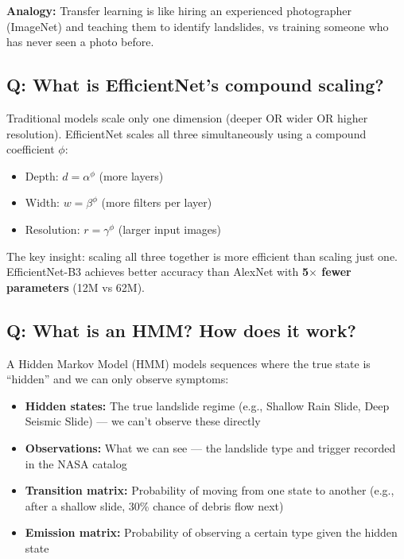 \documentclass[11pt]{article}
\begin{document}
\textbf{Analogy:} Transfer learning is like hiring an experienced photographer (ImageNet) and teaching them to identify landslides, vs training someone who has never seen a photo before.

\subsection{Q: What is EfficientNet's compound scaling?}

Traditional models scale only one dimension (deeper OR wider OR higher resolution). EfficientNet scales all three simultaneously using a compound coefficient $\phi$:

\begin{itemize}[noitemsep]
    \item Depth: $d = \alpha^\phi$ (more layers)
    \item Width: $w = \beta^\phi$ (more filters per layer)
    \item Resolution: $r = \gamma^\phi$ (larger input images)
\end{itemize}

The key insight: scaling all three together is more efficient than scaling just one. EfficientNet-B3 achieves better accuracy than AlexNet with \textbf{5$\times$ fewer parameters} (12M vs 62M).

\subsection{Q: What is an HMM? How does it work?}

A Hidden Markov Model (HMM) models sequences where the true state is ``hidden'' and we can only observe symptoms:

\begin{itemize}[noitemsep]
    \item \textbf{Hidden states:} The true landslide regime (e.g., Shallow Rain Slide, Deep Seismic Slide) --- we can't observe these directly
    \item \textbf{Observations:} What we can see --- the landslide type and trigger recorded in the NASA catalog
    \item \textbf{Transition matrix:} Probability of moving from one state to another (e.g., after a shallow slide, 30\% chance of debris flow next)
    \item \textbf{Emission matrix:} Probability of observing a certain type given the hidden state
\end{itemize}
\end{document}
